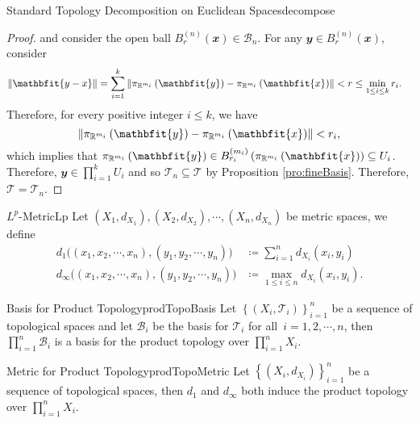 \documentclass[math]{amznotes}
\theoremstyle{remark}
\begin{document}
\begin{probox}{Standard Topology Decomposition on Euclidean Spaces}{decompose}
\begin{proof}
        and consider the open ball $B_r^{\left(n\right)}\left(\mathbfit{x}\right) \in \mathcal{B}_n$. For any $\mathbfit{y} \in B_r^{\left(n\right)}\left(\mathbfit{x}\right)$, consider 
        \begin{align*}
            \norm{\mathbfit{y - x}} & = \sum_{i = 1}^{k}\norm{\pi_{\R^{m_i}}\left(\mathbfit{y}\right) - \pi_{\R^{m_i}}\left(\mathbfit{x}\right)} < r \leq \min_{1 \leq i \leq k}r_i.
        \end{align*}
        Therefore, for every positive integer $i \leq k$, we have 
        \begin{equation*}
            \norm{\pi_{\R^{m_i}}\left(\mathbfit{y}\right) - \pi_{\R^{m_i}}\left(\mathbfit{x}\right)} < r_i,
        \end{equation*}
        which implies that $\pi_{\R^{m_i}}\left(\mathbfit{y}\right) \in B_{r_i}^{\left(m_i\right)}\left(\pi_{\R^{m_i}}\left(\mathbfit{x}\right)\right) \subseteq U_i$. Therefore, $\mathbfit{y} \in \prod_{i = 1}^{k}U_i$ and so $\mathcal{T}_n \subseteq \mathcal{T}$ by Proposition \ref{pro:fineBasis}. Therefore, $\mathcal{T} = \mathcal{T}_n$.
    \end{proof}
\end{probox}
\begin{dfnbox}{$L^p$-Metric}{Lp}
    Let $\left(X_1, d_{X_1}\right), \left(X_2, d_{X_2}\right), \cdots, \left(X_n, d_{X_n}\right)$ be metric spaces, we define 
    \begin{align*}
        d_1\bigl(\left(x_1, x_2, \cdots, x_n\right), \left(y_1, y_2, \cdots, y_n\right)\bigr) & \coloneqq \sum_{i = 1}^{n}d_{X_i}\left(x_i, y_i\right) \\
        d_{\infty}\bigl(\left(x_1, x_2, \cdots, x_n\right), \left(y_1, y_2, \cdots, y_n\right)\bigr) & \coloneqq \max_{1 \leq i \leq n}d_{X_i}\left(x_i, y_i\right).
    \end{align*}
\end{dfnbox}
\begin{probox}{Basis for Product Topology}{prodTopoBasis}
    Let $\left\{\left(X_i, \mathcal{T}_i\right)\right\}_{i = 1}^n$ be a sequence of topological spaces and let $\mathcal{B}_i$ be the basis for $\mathcal{T}_i$ for all~$i = 1, 2, \cdots, n$, then $\prod_{i = 1}^{n}\mathcal{B}_i$ is a basis for the product topology over $\prod_{i = 1}^nX_i$.
\end{probox}
\begin{probox}{Metric for Product Topology}{prodTopoMetric}
    Let $\left\{\left(X_i, d_{X_i}\right)\right\}_{i = 1}^n$ be a sequence of topological spaces, then $d_1$ and $d_{\infty}$ both induce the product topology over $\prod_{i = 1}^nX_i$.
\end{probox}
\end{document}
